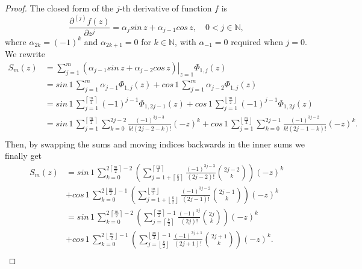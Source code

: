 \begin{proof}
The closed form of the $j$-th derivative of function $f$ is
$$\frac{\partial^{(j)}{f}(z)}{\partial{z}^{j}} = \alpha_{j}sin\,{z} +
\alpha_{j-1}cos\,{z}, \quad 0<j\in\mathbb{N},$$ where
$\alpha_{2k} = (-1)^{k}$ and $\alpha_{2k+1} = 0$ for $k\in\mathbb{N}$, with 
$\alpha_{-1}=0$ required when $j=0$. We rewrite
\begin{displaymath}
\begin{split}
  S_{m}(z) &= \sum_{j=1}^{m}{ \left. \left(\alpha_{j-1}sin\,{z} + \alpha_{j-2}cos\,{z}\right) \right|_{z=1}\Phi_{1,j}(z)} \\
       &= sin\,{1}\,\sum_{j=1}^{m}{ \alpha_{j-1}\Phi_{1,j}(z)} + cos\,{1}\,\sum_{j=1}^{m}{ \alpha_{j-2}\Phi_{1,j}(z)} \\
       &= sin\,{1}\,\sum_{j=1}^{\left\lceil \frac{m}{2} \right\rceil}{ (-1)^{j-1}\Phi_{1,2j-1}(z)} 
        + cos\,{1}\,\sum_{j=1}^{\left\lfloor \frac{m}{2} \right\rfloor}{ (-1)^{j-1}\Phi_{1,2j}(z)} \\
       &= sin\,{1}\,\sum_{j=1}^{\left\lceil \frac{m}{2} \right\rceil}{\sum_{k=0}^{2j-2}{ \frac{(-1)^{3j-3}}{k!(2j-2-k)!}{(-z)^{k}}} }
       + cos\,{1}\,\sum_{j=1}^{\left\lfloor \frac{m}{2} \right\rfloor}{\sum_{k=0}^{2j-1}{ \frac{(-1)^{3j-2}}{k!(2j-1-k)!}{(-z)^{k}}}}. \\
\end{split}
\end{displaymath}
Then, by swapping the sums and moving indices backwards in the inner sums we
finally get
\begin{displaymath}
\begin{split}
  S_{m}(z)  &= sin\,{1}\,\sum_{k=0}^{2 \left\lceil \frac{m}{2} \right\rceil-2}{\left(\sum_{j=1+\left\lceil \frac{k}{2}\right\rceil}^{\left\lceil \frac{m}{2} \right\rceil}{\frac{(-1)^{3j-3}}{(2j-2)!}{2j-2\choose k}}\right) {(-z)^{k}}}\\
            &+ cos\,{1}\,\sum_{k=0}^{2 \left\lfloor \frac{m}{2} \right\rfloor-1}{\left(\sum_{j=1+\left\lfloor \frac{k}{2}\right\rfloor}^{\left\lfloor \frac{m}{2} \right\rfloor}{ \frac{(-1)^{3j-2}}{(2j-1)!} {2j-1\choose k}}\right){(-z)^{k}}} \\
            &= sin\,{1}\,\sum_{k=0}^{2\,\left\lceil \frac{m}{2} \right\rceil-2}{\left(\sum_{j=\left\lceil \frac{k}{2}\right\rceil}^{\left\lceil \frac{m}{2} \right\rceil -1}{\frac{(-1)^{3j}}{(2j)!}{2j\choose k}}\right) {(-z)^{k}}}\\
            &+ cos\,{1}\,\sum_{k=0}^{2\,\left\lfloor \frac{m}{2} \right\rfloor-1}{\left(\sum_{j=\left\lfloor \frac{k}{2}\right\rfloor}^{\left\lfloor \frac{m}{2} \right\rfloor -1}{\frac{(-1)^{3j+1}}{(2j + 1)!} {2j+1\choose k}}\right){(-z)^{k}}}. \\
\end{split}
\end{displaymath}
\qedhere
\end{proof}

